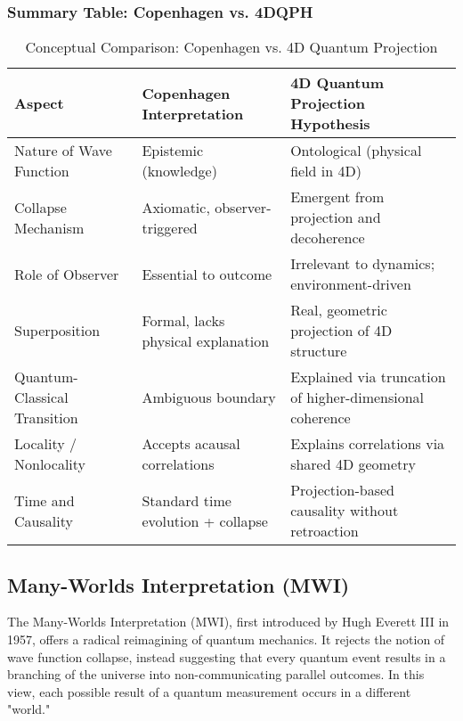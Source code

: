 \documentclass[12pt]{article}
\begin{document}
\subsubsection*{Summary Table: Copenhagen vs. 4DQPH}

\vspace{0.5em}  %
\begin{table}[H]
\centering
\renewcommand{\arraystretch}{1.3}
\begin{tabular}{|p{4cm}|p{5cm}|p{5cm}|}
\hline
\textbf{Aspect} & \textbf{Copenhagen Interpretation} & \textbf{4D Quantum Projection Hypothesis} \\
\hline
Nature of Wave Function & Epistemic (knowledge) & Ontological (physical field in 4D) \\
\hline
Collapse Mechanism & Axiomatic, observer-triggered & Emergent from projection and decoherence \\
\hline
Role of Observer & Essential to outcome & Irrelevant to dynamics; environment-driven \\
\hline
Superposition & Formal, lacks physical explanation & Real, geometric projection of 4D structure \\
\hline
Quantum-Classical Transition & Ambiguous boundary & Explained via truncation of higher-dimensional coherence \\
\hline
Locality / Nonlocality & Accepts acausal correlations & Explains correlations via shared 4D geometry \\
\hline
Time and Causality & Standard time evolution + collapse & Projection-based causality without retroaction \\
\hline
\end{tabular}
\caption{Conceptual Comparison: Copenhagen vs. 4D Quantum Projection}
\label{tab:copenhagen_vs_4dqph}
\end{table}
\vspace{0.5em}


\newpage

\subsection{Many-Worlds Interpretation (MWI)}

The Many-Worlds Interpretation (MWI), first introduced by Hugh Everett III in 1957, offers a radical reimagining of quantum mechanics. It rejects the notion of wave function collapse, instead suggesting that every quantum event results in a branching of the universe into non-communicating parallel outcomes. In this view, each possible result of a quantum measurement occurs in a different "world."
\end{document}
